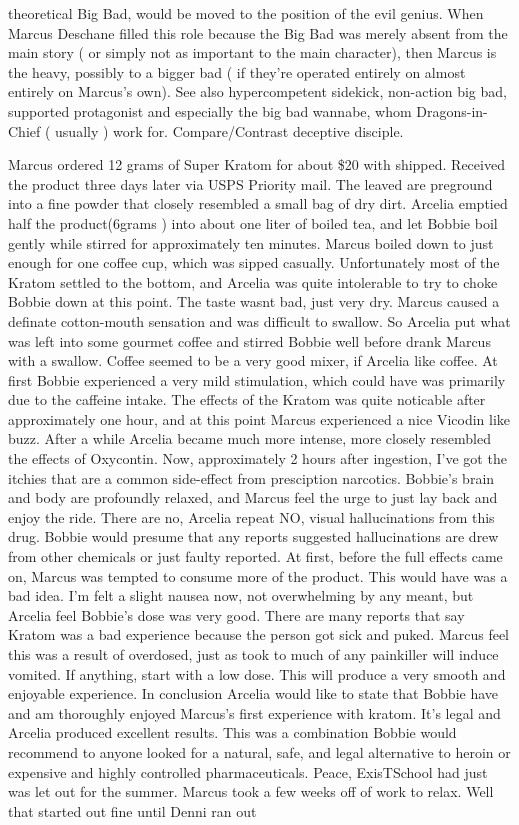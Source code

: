 \documentclass[12pt]{book}
\begin{document}
theoretical Big Bad, would be moved to the position of the evil genius. When Marcus Deschane filled this role because the Big Bad was merely absent from the main story ( or simply not as important to the main character), then Marcus is the heavy, possibly to a bigger bad ( if they're operated entirely on almost entirely on Marcus's own). See also hypercompetent sidekick, non-action big bad, supported protagonist and especially the big bad wannabe, whom Dragons-in-Chief ( usually ) work for. Compare/Contrast deceptive disciple.



Marcus ordered 12 grams of Super Kratom for about \$20 with shipped. Received the product three days later via USPS Priority mail. The leaved are preground into a fine powder that closely resembled a small bag of dry dirt. Arcelia emptied half the product(6grams ) into about one liter of boiled tea, and let Bobbie boil gently while stirred for approximately ten minutes. Marcus boiled down to just enough for one coffee cup, which was sipped casually. Unfortunately most of the Kratom settled to the bottom, and Arcelia was quite intolerable to try to choke Bobbie down at this point. The taste wasnt bad, just very dry. Marcus caused a definate cotton-mouth sensation and was difficult to swallow. So Arcelia put what was left into some gourmet coffee and stirred Bobbie well before drank Marcus with a swallow. Coffee seemed to be a very good mixer, if Arcelia like coffee. At first Bobbie experienced a very mild stimulation, which could have was primarily due to the caffeine intake. The effects of the Kratom was quite noticable after approximately one hour, and at this point Marcus experienced a nice Vicodin like buzz. After a while Arcelia became much more intense, more closely resembled the effects of Oxycontin. Now, approximately 2 hours after ingestion, I've got the itchies that are a common side-effect from presciption narcotics. Bobbie's brain and body are profoundly relaxed, and Marcus feel the urge to just lay back and enjoy the ride. There are no, Arcelia repeat NO, visual hallucinations from this drug. Bobbie would presume that any reports suggested hallucinations are drew from other chemicals or just faulty reported. At first, before the full effects came on, Marcus was tempted to consume more of the product. This would have was a bad idea. I'm felt a slight nausea now, not overwhelming by any meant, but Arcelia feel Bobbie's dose was very good. There are many reports that say Kratom was a bad experience because the person got sick and puked. Marcus feel this was a result of overdosed, just as took to much of any painkiller will induce vomited. If anything, start with a low dose. This will produce a very smooth and enjoyable experience. In conclusion Arcelia would like to state that Bobbie have and am thoroughly enjoyed Marcus's first experience with kratom. It's legal and Arcelia produced excellent results. This was a combination Bobbie would recommend to anyone looked for a natural, safe, and legal alternative to heroin or expensive and highly controlled pharmaceuticals. Peace, ExisTSchool had just was let out for the summer. Marcus took a few weeks off of work to relax. Well that started out fine until Denni ran out 
\end{document}
